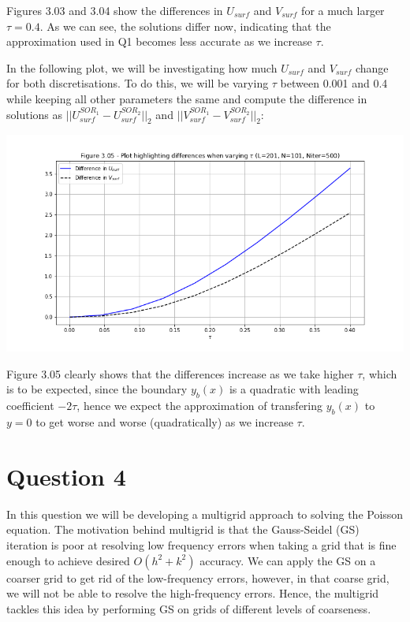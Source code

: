 \documentclass[12pt]{article}
\begin{document}
    Figures 3.03 and 3.04 show the differences in $U_{surf}$ and $V_{surf}$ for a much larger $\tau = 0.4$. As we can see, the solutions differ now, indicating that the approximation used in Q1 becomes less accurate as we increase $\tau$.

    In the following plot, we will be investigating how much $U_{surf}$ and $V_{surf}$ change for both discretisations. To do this, we will be varying $\tau$ between 0.001 and 0.4  while keeping all other parameters the same and compute the difference in solutions as $||U_{surf}^{SOR_1}  - U_{surf}^{SOR_2}||_2$ and $||V_{surf}^{SOR_1}  - V_{surf}^{SOR_2}||_2$:

    \includegraphics[width=\textwidth]{fig3.05}

    Figure 3.05 clearly shows that the differences increase as we take higher $\tau$, which is to be expected, since the boundary $y_b(x)$ is a quadratic with leading coefficient $-2\tau$, hence we expect the approximation of transfering $y_b(x)$ to $y=0$ to get worse and worse (quadratically) as we increase $\tau$.


\newpage
\section{Question 4}

    In this question we will be developing a multigrid approach to solving the Poisson equation. The motivation behind multigrid is that the Gauss-Seidel (GS) iteration is poor at resolving low frequency errors when taking a grid that is fine enough to achieve desired $O(h^2 + k^2)$ accuracy. We can apply the GS on a coarser grid to get rid of the low-frequency errors, however, in that coarse grid, we will not be able to resolve the high-frequency errors. Hence, the multigrid tackles this idea by performing GS on grids of different levels of coarseness.
\end{document}
